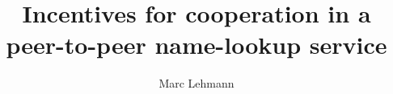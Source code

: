 \documentclass{beamer}
\title{Incentives for cooperation in a peer-to-peer name-lookup service}
\author{Marc Lehmann}
\date{}
\begin{document}
\frame{\titlepage}

\begin{frame}
\end{frame}
\end{document}
